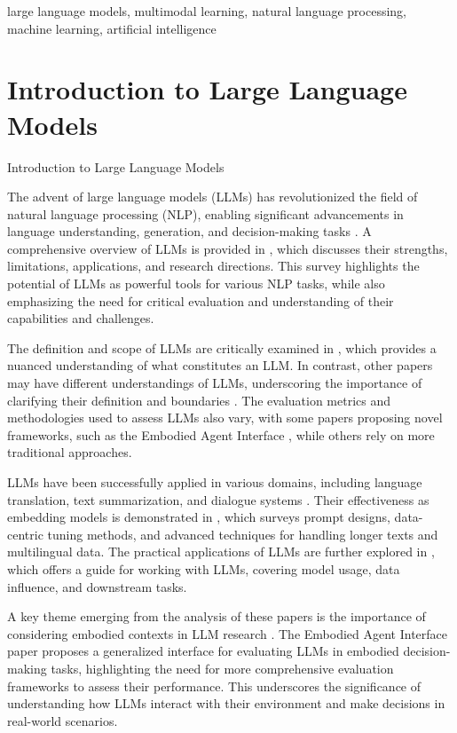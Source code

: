 \documentclass[conference]{IEEEtran}
\begin{document}
\begin{IEEEkeywords}
large language models, multimodal learning, natural language processing, machine learning, artificial intelligence
\end{IEEEkeywords}


\section{Introduction to Large Language Models}
Introduction to Large Language Models

The advent of large language models (LLMs) has revolutionized the field of natural language processing (NLP), enabling significant advancements in language understanding, generation, and decision-making tasks \cite{b1}. A comprehensive overview of LLMs is provided in \cite{b2}, which discusses their strengths, limitations, applications, and research directions. This survey highlights the potential of LLMs as powerful tools for various NLP tasks, while also emphasizing the need for critical evaluation and understanding of their capabilities and challenges.

The definition and scope of LLMs are critically examined in \cite{b3}, which provides a nuanced understanding of what constitutes an LLM. In contrast, other papers may have different understandings of LLMs, underscoring the importance of clarifying their definition and boundaries \cite{b4}. The evaluation metrics and methodologies used to assess LLMs also vary, with some papers proposing novel frameworks, such as the Embodied Agent Interface \cite{b5}, while others rely on more traditional approaches.

LLMs have been successfully applied in various domains, including language translation, text summarization, and dialogue systems \cite{b1}. Their effectiveness as embedding models is demonstrated in \cite{b4}, which surveys prompt designs, data-centric tuning methods, and advanced techniques for handling longer texts and multilingual data. The practical applications of LLMs are further explored in \cite{b6}, which offers a guide for working with LLMs, covering model usage, data influence, and downstream tasks.

A key theme emerging from the analysis of these papers is the importance of considering embodied contexts in LLM research \cite{b5}. The Embodied Agent Interface paper proposes a generalized interface for evaluating LLMs in embodied decision-making tasks, highlighting the need for more comprehensive evaluation frameworks to assess their performance. This underscores the significance of understanding how LLMs interact with their environment and make decisions in real-world scenarios.
\end{document}
